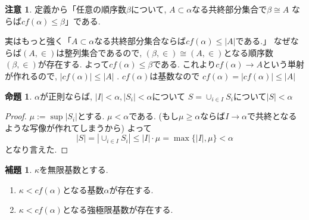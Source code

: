 \documentclass[dvipdfmx,a4paper,11pt]{report}
\theoremstyle{definition}
\newtheorem{lem}[thm]{補題}
\newtheorem{prop}[thm]{命題}
\newtheorem{rem}[thm]{注意}
\begin{document}
\begin{rem}
定義から「任意の順序数$\beta$について, $A \subset \alpha$なる共終部分集合で$\beta \cong A$
ならば$cf(\alpha) \le \beta$」である. 

実はもっと強く「$A \subset \alpha$なる共終部分集合ならば$cf(\alpha) \le |A|$である.」
なぜならば$(A, \in)$は整列集合であるので, $(\beta, \in) \cong (A, \in)$となる順序数$(\beta, \in)$が存在する.
よって$cf(\alpha) \le \beta$である.
これより$cf(\alpha)\to A$という単射が作れるので, $|cf(\alpha)| \le |A|$ . $cf(\alpha)$は基数なので
$cf(\alpha) = |cf(\alpha)| \le |A|$
\end{rem}


 \begin{tcolorbox}
 [colback = white, colframe = green!35!black, fonttitle = \bfseries,breakable = true]
\begin{prop}
\label{prop-regular-cardinal}
$\alpha$が正則ならば, $| I | <  \alpha, |S_i| < \alpha$について
$ S = \cup_{i \in I}S_i$について$|S| < \alpha$
\end{prop}
\end{tcolorbox}
\begin{proof}
$\mu := \sup |S_{i}|$とする.
$\mu < \alpha$である.
(もし$\mu \ge \alpha$ならば$I \to \alpha$で共終となるような写像が作れてしまうから)
よって
$$
|S| =
 |\cup_{i \in I}S_i |
 \le 
 | I | \cdot {\mu}
= \max \{|I|, \mu\}
< \alpha
$$
となり言えた. 
\end{proof}




 \begin{tcolorbox}
 [colback = white, colframe = green!35!black, fonttitle = \bfseries,breakable = true]
\begin{lem}\cite[000E 3.7 Cofinality]{Sta}
\label{lem-cofinal}
$\kappa$を無限基数とする.
\begin{enumerate}
\item $\kappa < cf(\alpha)$となる基数$\alpha$が存在する.
\item $\kappa < cf(\alpha)$となる強極限基数が存在する.
\end{enumerate}
\end{lem}
 \end{tcolorbox}
 
\end{document}
